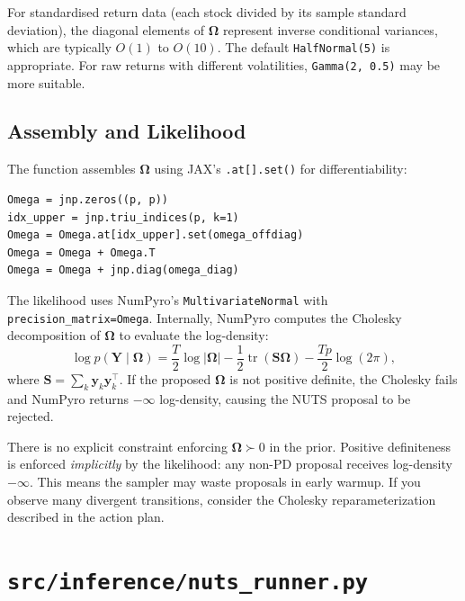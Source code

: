 \documentclass[11pt,a4paper]{article}
\newcommand{\tr}{\operatorname{tr}}
\newcommand{\bOmega}{\bm{\Omega}}
\begin{document}
\begin{tipbox}
For standardised return data (each stock divided by its sample standard deviation), the diagonal elements of $\bOmega$ represent inverse conditional variances, which are typically $O(1)$ to $O(10)$. The default \texttt{HalfNormal(5)} is appropriate. For raw returns with different volatilities, \texttt{Gamma(2, 0.5)} may be more suitable.
\end{tipbox}

\subsection{Assembly and Likelihood}

The function assembles $\bOmega$ using JAX's \texttt{.at[].set()} for differentiability:
\begin{lstlisting}
Omega = jnp.zeros((p, p))
idx_upper = jnp.triu_indices(p, k=1)
Omega = Omega.at[idx_upper].set(omega_offdiag)
Omega = Omega + Omega.T
Omega = Omega + jnp.diag(omega_diag)
\end{lstlisting}

The likelihood uses NumPyro's \texttt{MultivariateNormal} with \texttt{precision\_matrix=Omega}. Internally, NumPyro computes the Cholesky decomposition of $\bOmega$ to evaluate the log-density:
\[
  \log p(\bm{Y} \mid \bOmega) = \frac{T}{2}\log|\bOmega| - \frac{1}{2}\tr(\bm{S}\bOmega) - \frac{Tp}{2}\log(2\pi),
\]
where $\bm{S} = \sum_k \bm{y}_k\bm{y}_k^\top$. If the proposed $\bOmega$ is not positive definite, the Cholesky fails and NumPyro returns $-\infty$ log-density, causing the NUTS proposal to be rejected.

\begin{warningbox}
There is no explicit constraint enforcing $\bOmega \succ 0$ in the prior. Positive definiteness is enforced \emph{implicitly} by the likelihood: any non-PD proposal receives log-density $-\infty$. This means the sampler may waste proposals in early warmup. If you observe many divergent transitions, consider the Cholesky reparameterization described in the action plan.
\end{warningbox}


\section{\texttt{src/inference/nuts\_runner.py}}\label{sec:nuts}
\end{document}
